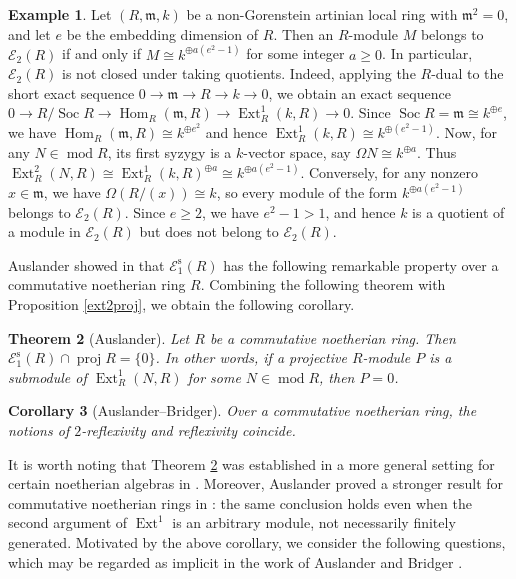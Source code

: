 \documentclass{amsart}
\newtheorem{thm}{Theorem}[section]
\newtheorem{cor}[thm]{Corollary}
\theoremstyle{definition}
\newtheorem{ex}[thm]{Example}
\theoremstyle{remark}
\numberwithin{equation}{thm}
\def\E{\mathcal{E}}
\def\Ext{\operatorname{Ext}}
\def\ge{\geqslant}
\def\Hom{\operatorname{Hom}}
\def\m{\mathfrak{m}}
\def\mod{\operatorname{mod}}
\def\proj{\operatorname{proj}}
\def\Soc{\operatorname{Soc}}
\def\syz{\Omega}
\begin{document}
\begin{ex}
Let $(R,\m,k)$ be a non-Gorenstein artinian local ring with $\m^2=0$, and let $e$ be the embedding dimension of $R$.
Then an $R$-module $M$ belongs to $\E_2(R)$ if and only if $M\cong k^{\oplus a(e^2-1)}$ for some integer $a\ge0$.
In particular, $\E_2(R)$ is not closed under taking quotients.
Indeed, applying the $R$-dual to the short exact sequence $0\to\m\to R\to k\to0$, we obtain an exact sequence
$0\to R/\Soc R\to\Hom_R(\m,R)\to\Ext^1_R(k,R)\to0$.
Since $\Soc R=\m\cong k^{\oplus e}$, we have $\Hom_R(\m,R)\cong k^{\oplus e^2}$ and hence $\Ext^1_R(k,R)\cong k^{\oplus(e^2-1)}$.
Now, for any $N\in\mod R$, its first syzygy is a $k$-vector space, say $\syz N\cong k^{\oplus a}$.
Thus $\Ext^2_R(N,R)\cong\Ext^1_R(k,R)^{\oplus a}\cong k^{\oplus a(e^2-1)}$.
Conversely, for any nonzero $x\in\m$, we have $\syz(R/(x))\cong k$, so every module of the form $k^{\oplus a(e^2-1)}$ belongs to $\E_2(R)$.
Since $e\ge2$, we have $e^2-1>1$, and hence $k$ is a quotient of a module in $\E_2(R)$ but does not belong to $\E_2(R)$.
\end{ex}

Auslander showed in \cite[Corollary 3.6]{Aus69} that $\E_1^{\mathrm{s}}(R)$ has the following remarkable property over a commutative noetherian ring $R$.
Combining the following theorem with Proposition \ref{ext2proj}, we obtain the following corollary.

\begin{thm}[Auslander]\label{Ausremarkable}
Let $R$ be a commutative noetherian ring. Then $\E_1^{\mathrm{s}}(R)\cap\proj R=\{0\}$.
In other words, if a projective $R$-module $P$ is a submodule of $\Ext^1_R(N,R)$ for some $N\in\mod R$, then $P=0$.
\end{thm}

\begin{cor}[Auslander--Bridger]\label{AB2ref}
Over a commutative noetherian ring, the notions of $2$-reflexivity and reflexivity coincide.
\end{cor}

It is worth noting that Theorem \ref{Ausremarkable} was established in a more general setting for certain noetherian algebras in \cite[Proposition 3.5]{Aus69}.
Moreover, Auslander proved a stronger result for commutative noetherian rings in \cite[Theorem 4.1]{Aus69}: the same conclusion holds even when the second argument of $\Ext^1$ is an arbitrary module, not necessarily finitely generated.
Motivated by the above corollary, we consider the following questions, which may be regarded as implicit in the work of Auslander and Bridger \cite{AB}.
\end{document}
